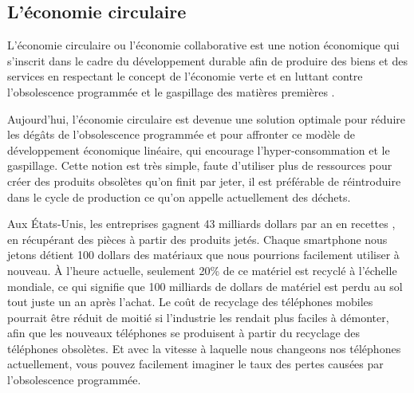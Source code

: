 \subsection{L'économie circulaire}


\smallbreak
L’économie circulaire ou l’économie collaborative est une notion économique qui s'inscrit dans le cadre du développement durable afin de produire des biens et des services en respectant le concept de l'économie verte et en luttant contre l'obsolescence programmée et le gaspillage des matières premières \cite{wiki_ec}.


\smallbreak
Aujourd'hui, l'économie circulaire est devenue une solution optimale pour réduire les dégâts de l'obsolescence programmée et pour affronter ce modèle de développement économique linéaire, qui encourage l’hyper-consommation et le gaspillage. Cette notion est très simple, faute d'utiliser plus de ressources pour créer des produits obsolètes qu'on finit par jeter, il est préférable de réintroduire dans le cycle de production ce qu'on appelle actuellement des déchets.


\smallbreak
Aux États-Unis, les entreprises gagnent 43 milliards dollars par an en recettes \cite{usatoday}, en récupérant des pièces à partir des produits jetés. Chaque smartphone nous jetons détient 100 dollars des matériaux que nous pourrions facilement utiliser à nouveau. À l'heure actuelle, seulement 20\% de ce matériel est recyclé à l'échelle mondiale, ce qui signifie que 100 milliards de dollars de matériel est perdu au sol tout juste un an après l'achat. Le coût de recyclage des téléphones mobiles pourrait être réduit de moitié si l'industrie les rendait plus faciles à démonter, afin que les nouveaux téléphones se produisent à partir du recyclage des téléphones obsolètes. Et avec la vitesse à laquelle nous changeons nos téléphones actuellement, vous pouvez facilement imaginer le taux des pertes causées par l'obsolescence programmée.


